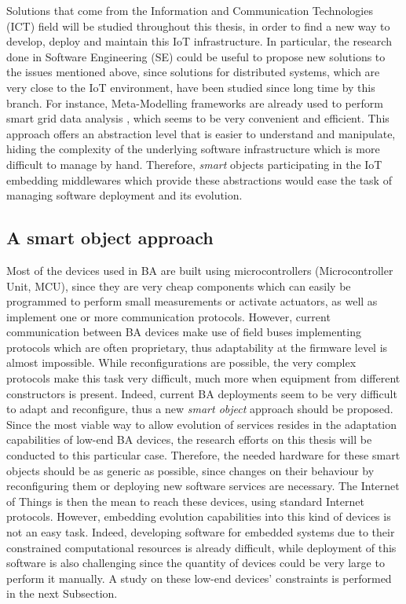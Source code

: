 Solutions that come from the Information and Communication Technologies (ICT) field will be studied throughout this thesis, in order to find a new way to develop, deploy and maintain this IoT infrastructure.
In particular, the research done in Software Engineering (SE) could be useful to propose new solutions to the issues mentioned above, since solutions for distributed systems, which are very close to the IoT environment, have been studied since long time by this branch.
For instance, Meta-Modelling frameworks are already used to perform smart grid data analysis \cite{hartmann2014realisticsmartgrid}, which seems to be very convenient and efficient.
This approach offers an abstraction level that is easier to understand and manipulate, hiding the complexity of the underlying software infrastructure which is more difficult to manage by hand.
Therefore, \textit{smart} objects participating in the IoT embedding middlewares which provide these abstractions would ease the task of managing software deployment and its evolution.

\subsection{A smart object approach}
\label{subsec:smartObjects}
Most of the devices used in BA are built using microcontrollers (Microcontroller Unit, MCU), since they are very cheap components which can easily be programmed to perform small measurements or activate actuators, as well as implement one or more communication protocols.
However, current communication between BA devices make use of field buses implementing protocols which are often proprietary, thus adaptability at the firmware level is almost impossible.
While reconfigurations are possible, the very complex protocols make this task very difficult, much more when equipment from different constructors is present.
Indeed, current BA deployments seem to be very difficult to adapt and reconfigure, thus a new \textit{smart object} approach should be proposed.
Since the most viable way to allow evolution of services resides in the adaptation capabilities of low-end BA devices, the research efforts on this thesis will be conducted to this particular case.
Therefore, the needed hardware for these smart objects should be as generic as possible, since changes on their behaviour by reconfiguring them or deploying new software services are necessary.
The Internet of Things is then the mean to reach these devices, using standard Internet protocols.
However, embedding evolution capabilities into this kind of devices is not an easy task.
Indeed, developing software for embedded systems due to their constrained computational resources is already difficult, while deployment of this software is also challenging since the quantity of devices could be very large to perform it manually.
A study on these low-end devices' constraints is performed in the next Subsection.


